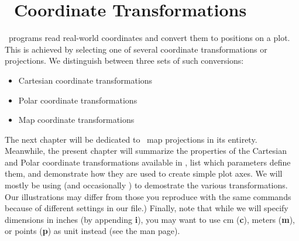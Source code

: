 %
%
\chapter{\gmt\ Coordinate Transformations}
\label{ch:5}
\thispagestyle{headings}

\GMT\ programs read real-world coordinates and convert them to positions on a plot.
This is achieved by selecting one of several coordinate transformations or projections.
We distinguish between three sets of such conversions:

\begin{itemize}
\item Cartesian coordinate transformations
\item Polar coordinate transformations
\item Map coordinate transformations
\end{itemize}

The next chapter will be dedicated to \GMT\ map projections in its entirety.  Meanwhile, the present chapter
will summarize the properties of the Cartesian and Polar coordinate transformations available in \GMT, list
which parameters define them, and demonstrate how they are used to create simple plot axes.  We will mostly
be using  (and occasionally ) to demostrate the various transformations.
Our illustrations may differ from those you reproduce with the same commands because of different settings
in our  file.)  Finally, note that while we will specify dimensions in inches (by
appending {\bf i}), you may want to use cm ({\bf c}), meters ({\bf m}), or points ({\bf p}) as unit instead
(see the  man page). 



